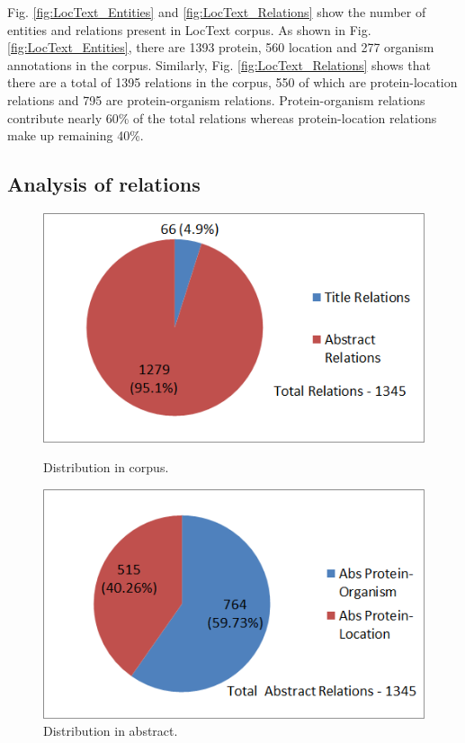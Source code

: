 Fig. \ref{fig:LocText_Entities} and \ref{fig:LocText_Relations} show the number of entities and relations present in LocText corpus. As shown in  Fig. \ref{fig:LocText_Entities}, there are 1393 protein, 560 location and 277 organism annotations in the corpus. Similarly, Fig. \ref{fig:LocText_Relations} shows that there are a total of 1395 relations in the corpus, 550 of which are protein-location relations and 795 are protein-organism relations. Protein-organism relations contribute nearly 60\% of the total relations whereas protein-location relations make up remaining 40\%.

\subsection*{Analysis of relations}

\begin{figure}
\centering
\begin{minipage}{.5\textwidth}
  \centering
  \includegraphics[width=.95\textwidth]{figures/Rel_Title_Abs_Distribution.png}
  \caption{Distribution in corpus.}
  \label{fig:Rel_Title_Abs}
\end{minipage}%
\begin{minipage}{.5\textwidth}
  \centering
  \includegraphics[width=.95\textwidth]{figures/AbsRel_PO_PL_Distribution.png}
  \caption{Distribution in abstract.}
  \label{fig:Rel_Abs_PO_PL}
\end{minipage}
\end{figure}

